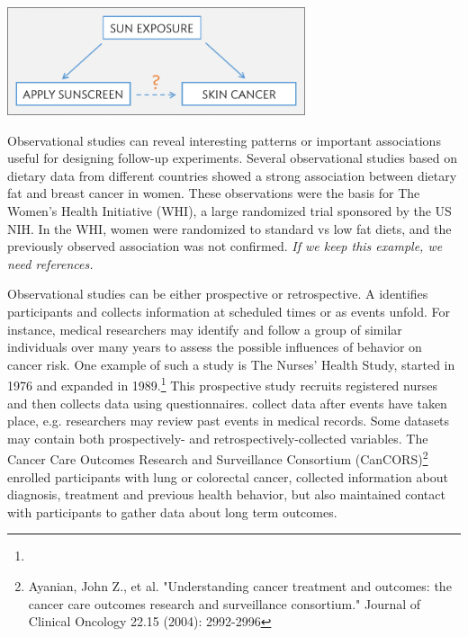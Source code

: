 \begin{doublespace}
\begin{center}
	\includegraphics[height=1.25in]{ch_intro_to_data_oi_biostat/figures/variables/confoundingVariable.png}
\end{center}

Observational studies can reveal interesting patterns or important associations useful for designing follow-up experiments. Several observational studies based on dietary data from different countries showed a strong association between dietary fat and breast cancer in women.  These observations were the basis for The Women's Health Initiative (WHI), a large randomized trial sponsored by the US NIH.  In the WHI, women were randomized to standard vs low fat diets, and the previously observed association was not confirmed.  \textit{If we keep this example, we need references.}

Observational studies can be either prospective or retrospective. A  identifies participants and collects information at scheduled times or as events unfold. For instance, medical researchers may identify and follow a group of similar individuals over many years to assess the possible influences of behavior on cancer risk. One example of such a study is The Nurses' Health Study, started in 1976 and expanded in 1989.\footnote{\texttt{}} This prospective study recruits registered nurses and then collects data using questionnaires.  collect data after events have taken place, e.g. researchers may review past events in medical records. Some datasets may contain both prospectively- and retrospectively-collected variables. The Cancer Care Outcomes Research and Surveillance Consortium (CanCORS)\footnote{Ayanian, John Z., et al. "Understanding cancer treatment and outcomes: the cancer care outcomes research and surveillance consortium." Journal of Clinical Oncology 22.15 (2004): 2992-2996} enrolled participants with lung or colorectal cancer, collected information about diagnosis, treatment and previous health behavior, but also maintained contact with participants to gather data about long term outcomes.  



\end{doublespace}
